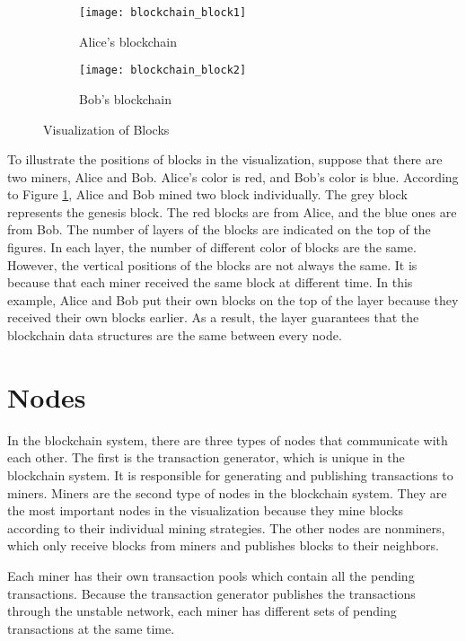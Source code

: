 \begin{figure}[htb]
    \centering
    \begin{subfigure}[b]{0.4\textwidth}
        \centering
        \texttt{[image: blockchain\_block1]}
        \caption{Alice's blockchain}
    \end{subfigure}
    \hfill
    \begin{subfigure}[b]{0.4\textwidth}
        \centering
        \texttt{[image: blockchain\_block2]}
        \caption{Bob's blockchain}
    \end{subfigure}

    \caption{Visualization of Blocks}
    \label{fig:visualization of blocks}
\end{figure}

To illustrate the positions of blocks in the visualization, suppose that there are two miners, Alice and Bob. Alice's color is red, and Bob's color is blue. According to Figure \ref{fig:visualization of blocks}, Alice and Bob mined two block individually. The grey block represents the genesis block. The red blocks are from Alice, and the blue ones are from Bob. The number of layers of the blocks are indicated on the top of the figures. In each layer, the number of different color of blocks are the same. However, the vertical positions of the blocks are not always the same. It is because that each miner received the same block at different time. In this example, Alice and Bob put their own blocks on the top of the layer because they received their own blocks earlier. As a result, the layer guarantees that the blockchain data structures are the same between every node.

\section{Nodes}

In the blockchain system, there are three types of nodes that communicate with each other. The first is the transaction generator, which is unique in the blockchain system. It is responsible for generating and publishing transactions to miners. Miners are the second type of nodes in the blockchain system. They are the most important nodes in the visualization because they mine blocks according to their individual mining strategies. The other nodes are nonminers, which only receive blocks from miners and publishes blocks to their neighbors.

Each miner has their own transaction pools which contain all the pending transactions. Because the transaction generator publishes the transactions through the unstable network, each miner has different sets of pending transactions at the same time.

